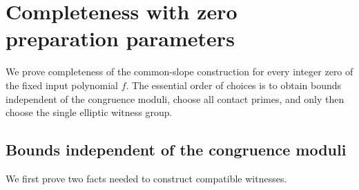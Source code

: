 \documentclass[11pt,reqno]{amsart}
\theoremstyle{definition}
\numberwithin{equation}{section}
\begin{document}
\section{Completeness with zero preparation parameters}\label{sec:sharing}
We prove completeness of the common-slope construction for every integer zero of the fixed input polynomial $f$. The essential order of choices is to obtain bounds independent of the congruence moduli, choose all contact primes, and only then choose the single elliptic witness group.

\subsection{Bounds independent of the congruence moduli}
We first prove two facts needed to construct compatible witnesses.
\end{document}
